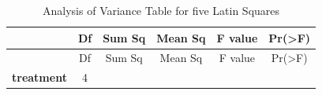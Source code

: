 \documentclass[]{article}
\begin{document}
\begin{longtable}[]{@{}cccccc@{}}
\caption{Analysis of Variance Table for five Latin
Squares}\tabularnewline
\toprule
\begin{minipage}[b]{0.19\columnwidth}\centering\strut
~\strut
\end{minipage} & \begin{minipage}[b]{0.06\columnwidth}\centering\strut
Df\strut
\end{minipage} & \begin{minipage}[b]{0.10\columnwidth}\centering\strut
Sum Sq\strut
\end{minipage} & \begin{minipage}[b]{0.12\columnwidth}\centering\strut
Mean Sq\strut
\end{minipage} & \begin{minipage}[b]{0.12\columnwidth}\centering\strut
F value\strut
\end{minipage} & \begin{minipage}[b]{0.12\columnwidth}\centering\strut
Pr(\textgreater{}F)\strut
\end{minipage}\tabularnewline
\midrule
\endfirsthead
\toprule
\begin{minipage}[b]{0.19\columnwidth}\centering\strut
~\strut
\end{minipage} & \begin{minipage}[b]{0.06\columnwidth}\centering\strut
Df\strut
\end{minipage} & \begin{minipage}[b]{0.10\columnwidth}\centering\strut
Sum Sq\strut
\end{minipage} & \begin{minipage}[b]{0.12\columnwidth}\centering\strut
Mean Sq\strut
\end{minipage} & \begin{minipage}[b]{0.12\columnwidth}\centering\strut
F value\strut
\end{minipage} & \begin{minipage}[b]{0.12\columnwidth}\centering\strut
Pr(\textgreater{}F)\strut
\end{minipage}\tabularnewline
\midrule
\endhead
\begin{minipage}[t]{0.19\columnwidth}\centering\strut
\textbf{treatment}\strut
\end{minipage} & \begin{minipage}[t]{0.06\columnwidth}\centering\strut
4\strut
\end{minipage} & \begin{minipage}[t]{0.10\columnwidth}\centering\strut

\end{minipage}
\end{longtable}
\end{document}

